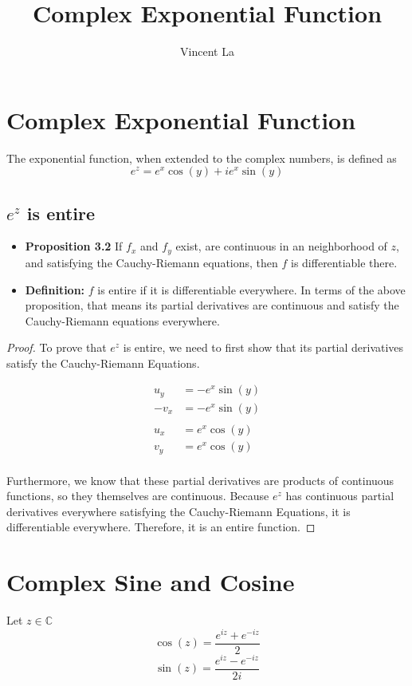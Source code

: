\documentclass[]{article}
\title{Complex Exponential Function}
\author{Vincent La}
\begin{document}
\maketitle

\section{Complex Exponential Function}
The exponential function, when extended to the complex numbers, is defined as
\[e^z = e^{x}\cos(y) + ie^{x}\sin(y) \]

\subsection{$e^z$ is entire}
\begin{itemize}
	\item \textbf{Proposition 3.2} If $f_x$ and $f_y$ exist, are continuous in an neighborhood of $z$, and satisfying the Cauchy-Riemann equations, then $f$ is differentiable there.
	\item \textbf{Definition:} $f$ is entire if it is differentiable everywhere. In terms of the above proposition, that means its partial derivatives are continuous and satisfy the Cauchy-Riemann equations everywhere.
\end{itemize}

\begin{proof}
	To prove that $e^z$ is entire, we need to first show that its partial derivatives satisfy the Cauchy-Riemann Equations.
	
	\[\begin{aligned}
		u_y &= -e^x\sin(y) \\
		-v_x &= -e^x\sin(y) \\ 
		\\
		u_x &= e^x\cos(y) \\
		v_y &= e^x\cos(y) \\
	\end{aligned}\]
	
	Furthermore, we know that these partial derivatives are products of continuous functions, so they themselves are continuous. Because $e^z$ has continuous partial derivatives everywhere satisfying the Cauchy-Riemann Equations, it is differentiable everywhere. Therefore, it is an entire function.
\end{proof}

\section{Complex Sine and Cosine}
Let $z \in \mathbb{C}$
\[\cos(z) = \frac{e^{iz} + e^{-iz}}{2}\]
\[\sin(z) = \frac{e^{iz} - e^{-iz}}{2i}\]
	
\end{document}
